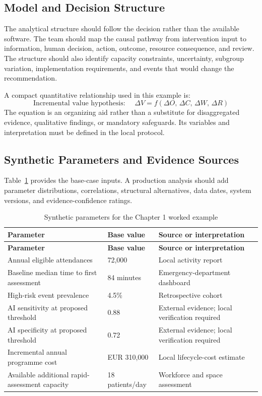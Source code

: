 \subsection{Model and Decision Structure}
The analytical structure should follow the decision rather than the available
software. The team should map the causal pathway from intervention input to
information, human decision, action, outcome, resource consequence, and review.
The structure should also identify capacity constraints, uncertainty, subgroup
variation, implementation requirements, and events that would change the
recommendation.

A compact quantitative relationship used in this example is:
\begin{equation}
\text{Incremental value hypothesis: }\quad \Delta V = f(\Delta O,\,\Delta C,\,\Delta W,\,\Delta R)
\label{eq:comp-ch01-key-relationship}
\end{equation}
The equation is an organizing aid rather than a substitute for disaggregated evidence,
qualitative findings, or mandatory safeguards. Its variables and interpretation must
be defined in the local protocol.

\subsection{Synthetic Parameters and Evidence Sources}
Table~\ref{tab:comp-ch01-parameters} provides the base-case inputs. A
production analysis should add parameter distributions, correlations, structural
alternatives, data dates, system versions, and evidence-confidence ratings.

\begin{longtable}{@{}p{}p{}p{}@{}}
\caption{Synthetic parameters for the Chapter 1 worked example}
\label{tab:comp-ch01-parameters}\\
\toprule
\textbf{Parameter} & \textbf{Base value} & \textbf{Source or interpretation} \\
\midrule
\endfirsthead
\toprule
\textbf{Parameter} & \textbf{Base value} & \textbf{Source or interpretation} \\
\midrule
\endhead
\bottomrule
\endlastfoot
Annual eligible attendances & 72,000 & Local activity report \\
Baseline median time to first assessment & 84 minutes & Emergency-department dashboard \\
High-risk event prevalence & 4.5\% & Retrospective cohort \\
AI sensitivity at proposed threshold & 0.88 & External evidence; local verification required \\
AI specificity at proposed threshold & 0.72 & External evidence; local verification required \\
Incremental annual programme cost & EUR 310,000 & Local lifecycle-cost estimate \\
Available additional rapid-assessment capacity & 18 patients/day & Workforce and space assessment \\
\end{longtable}

